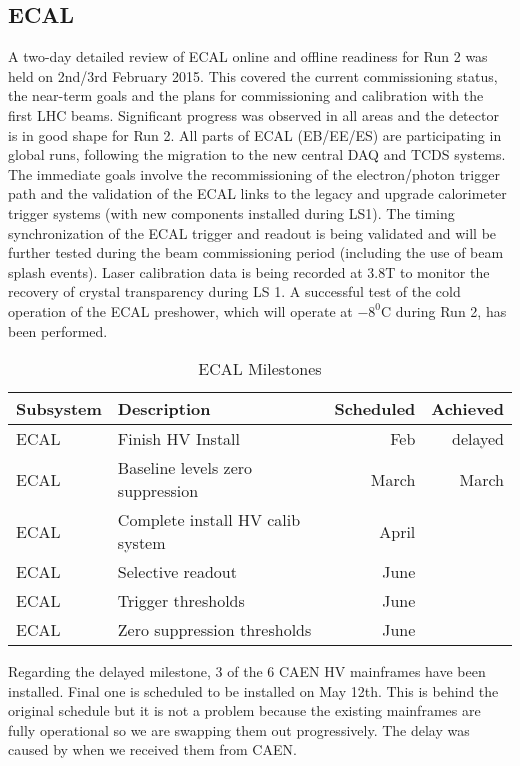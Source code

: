 \subsection{ECAL}
A two-day detailed review of ECAL online and offline readiness for Run 2 was held on 2nd/3rd February 2015. This covered the current commissioning status,  the near-term goals and the plans for commissioning and calibration with the first LHC beams. Significant progress was observed in all areas and the detector is in good shape for Run 2. All parts of ECAL (EB/EE/ES) are participating in global runs, following the migration to the new central DAQ and TCDS systems. The immediate goals involve the recommissioning of the electron/photon trigger path and the validation of the ECAL links to the legacy and upgrade calorimeter trigger systems (with new components installed during LS1). The timing synchronization of the ECAL trigger and readout is being validated and will be further tested during the beam commissioning period (including the use of beam splash events). Laser calibration data is being recorded at 3.8T to monitor the recovery of crystal transparency during LS 1. A successful test of the cold operation of the ECAL preshower, which will operate at $-8^{0}$C during Run 2, has been performed.
\begin{table}[htp]
\caption{ECAL Milestones}
\begin{center}
\begin{tabular}{|l|l|r|r|}
\hline
Subsystem&Description&Scheduled&Achieved\\
\hline
ECAL & Finish HV Install& Feb & delayed\\
\hline
ECAL & Baseline levels zero suppression& March & March \\
\hline
ECAL & Complete install HV calib system & April &\\
\hline
ECAL & Selective readout& June & \\
\hline
ECAL & Trigger thresholds & June & \\
\hline
ECAL & Zero suppression thresholds & June & \\
\hline
\end{tabular}
\end{center}
\label{ECALMilestones}
\end{table}

Regarding the delayed milestone, 3 of the 6 CAEN HV mainframes have been installed. Final one is scheduled to be installed on May 12th. This is behind the original schedule but it is
not a problem because the existing mainframes are fully operational so we are swapping them out progressively. The delay was caused by when we 
received them from CAEN.


